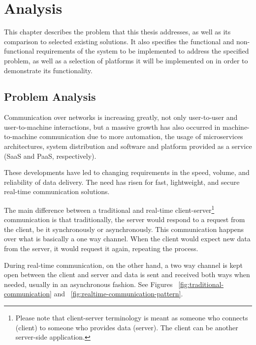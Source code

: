 \chapter{Analysis}\label{chap:analysis}

This chapter describes the problem that this thesis addresses, as well as its comparison to selected existing solutions. It also specifies the functional and non-functional requirements of the system to be implemented to address the specified problem, as well as a selection of platforms it will be implemented on in order to demonstrate its functionality.

\section{Problem Analysis}

Communication over networks is increasing greatly, not only user-to-user and user-to-machine interactions, but a massive growth has also occurred in machine-to-machine communication due to more automation, the usage of microservices architectures, system distribution and software and platform provided as a service (SaaS and PaaS, respectively).

These developments have led to changing requirements in the speed, volume, and reliability of data delivery. The need has risen for fast, lightweight, and secure real-time communication solutions.

The main difference between a traditional and real-time client-server\footnote{Please note that client-server terminology is meant as someone who connects (client) to someone who provides data (server). The client can be another server-side application.} communication is that traditionally, the server would respond to a request from the client, be it synchronously or asynchronously. This communication happens over what is basically a one way channel. When the client would expect new data from the server, it would request it again, repeating the process.

During real-time communication, on the other hand, a two way channel is kept open between the client and server and data is sent and received both ways when needed, usually in an asynchronous fashion. See Figures ~\ref{fig:traditional-communication} and ~\ref{fig:realtime-communication-pattern}.

